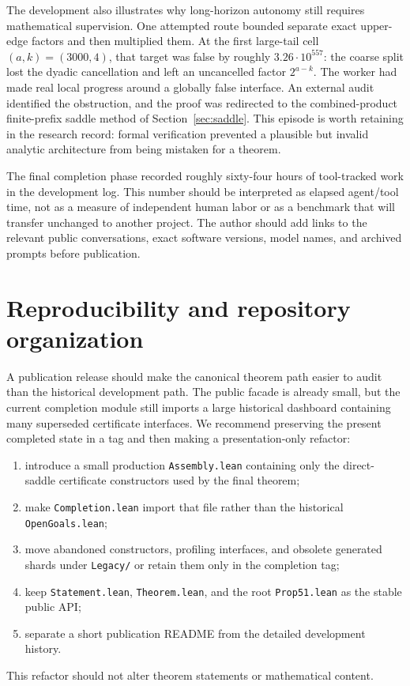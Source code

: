 \documentclass[11pt]{article}
\theoremstyle{definition}
\theoremstyle{remark}
\newcommand{\code}[1]{\texttt{#1}}
\begin{document}
The development also illustrates why long-horizon autonomy still requires
mathematical supervision.  One attempted route bounded separate exact
upper-edge factors and then multiplied them.  At the first large-tail cell
$(a,k)=(3000,4)$, that target was false by roughly $3.26\cdot10^{557}$: the
coarse split lost the dyadic cancellation and left an uncancelled factor
$2^{a-k}$.  The worker had made real local progress around a globally false
interface.  An external audit identified the obstruction, and the proof was
redirected to the combined-product finite-prefix saddle method of
Section~\ref{sec:saddle}.  This episode is worth retaining in the research
record: formal verification prevented a plausible but invalid analytic
architecture from being mistaken for a theorem.

The final completion phase recorded roughly sixty-four hours of tool-tracked
work in the development log.  This number should be interpreted as elapsed
agent/tool time, not as a measure of independent human labor or as a benchmark
that will transfer unchanged to another project.  The author should add links
to the relevant public conversations, exact software versions, model names,
and archived prompts before publication.

\section{Reproducibility and repository organization}\label{sec:repro}

A publication release should make the canonical theorem path easier to audit
than the historical development path.  The public facade is already small,
but the current completion module still imports a large historical dashboard
containing many superseded certificate interfaces.  We recommend preserving
the present completed state in a tag and then making a presentation-only
refactor:
\begin{enumerate}[leftmargin=2em]
  \item introduce a small production \code{Assembly.lean} containing only the
  direct-saddle certificate constructors used by the final theorem;
  \item make \code{Completion.lean} import that file rather than the historical
  \code{OpenGoals.lean};
  \item move abandoned constructors, profiling interfaces, and obsolete
  generated shards under \code{Legacy/} or retain them only in the completion
  tag;
  \item keep \code{Statement.lean}, \code{Theorem.lean}, and the root
  \code{Prop51.lean} as the stable public API;
  \item separate a short publication README from the detailed development
  history.
\end{enumerate}
This refactor should not alter theorem statements or mathematical content.
\end{document}
